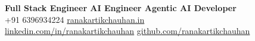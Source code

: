 \documentclass[10pt,a4paper]{moderncv}
\begin{document}
\maketitle
\vspace{-12mm}

\begin{center}
\scriptsize
\textbf{Full Stack Engineer \textbar{} AI Engineer \textbar{} Agentic AI Developer}\\[-0.2mm]
\emailsymbol\enspace{}
\quad \mobilephonesymbol\enspace +91 6396934224
\quad \faHome\enspace\href{https://ranakartikchauhan.in}{ranakartikchauhan.in}\\[-0.3mm]
\faLinkedin\enspace\href{https://linkedin.com/in/ranakartikchauhan}{linkedin.com/in/ranakartikchauhan}
\quad \faGithub\enspace\href{https://github.com/ranakartikchauhan}{github.com/ranakartikchauhan}
\end{center}
\vspace{-4.5mm}
\end{document}
